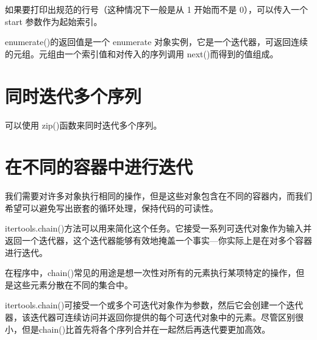 如果要打印出规范的行号（这种情况下一般是从 1 开始而不是 0），可以传入一个 start 参数作为起始索引。

enumerate()的返回值是一个 enumerate 对象实例，它是一个迭代器，可返回连续的元组。元组由一个索引值和对传入的序列调用 next()而得到的值组成。
\section{同时迭代多个序列}
可以使用 zip()函数来同时迭代多个序列。
\section{在不同的容器中进行迭代}
我们需要对许多对象执行相同的操作，但是这些对象包含在不同的容器内，而我们希望可以避免写出嵌套的循环处理，保持代码的可读性。

itertools.chain()方法可以用来简化这个任务。它接受一系列可迭代对象作为输入并返回一个迭代器，这个迭代器能够有效地掩盖一个事实—你实际上是在对多个容器进行迭代。

在程序中，chain()常见的用途是想一次性对所有的元素执行某项特定的操作，但是这些元素分散在不同的集合中。

itertools.chain()可接受一个或多个可迭代对象作为参数，然后它会创建一个迭代器，该迭代器可连续访问并返回你提供的每个可迭代对象中的元素。尽管区别很小，但是chain()比首先将各个序列合并在一起然后再迭代要更加高效。
\section{}
\section{}
\section{}
\section{}